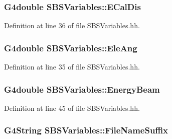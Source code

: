 \hypertarget{class_s_b_s_variables_ad7c0c85364e09e7dc5f7d687bf7fbbf4}{
\subsubsection[{E\-Cal\-Dis}]{\setlength{\rightskip}{0pt plus 5cm}G4double S\-B\-S\-Variables\-::\-E\-Cal\-Dis}}\label{class_s_b_s_variables_ad7c0c85364e09e7dc5f7d687bf7fbbf4}


Definition at line 36 of file S\-B\-S\-Variables.\-hh.

\hypertarget{class_s_b_s_variables_a3286bfb8c9f691a7315a5c97c7ea1adc}{
\subsubsection[{Ele\-Ang}]{\setlength{\rightskip}{0pt plus 5cm}G4double S\-B\-S\-Variables\-::\-Ele\-Ang}}\label{class_s_b_s_variables_a3286bfb8c9f691a7315a5c97c7ea1adc}


Definition at line 35 of file S\-B\-S\-Variables.\-hh.

\hypertarget{class_s_b_s_variables_a690e4d01c59328ad6ac6f53a9b6cc3e7}{
\subsubsection[{Energy\-Beam}]{\setlength{\rightskip}{0pt plus 5cm}G4double S\-B\-S\-Variables\-::\-Energy\-Beam}}\label{class_s_b_s_variables_a690e4d01c59328ad6ac6f53a9b6cc3e7}


Definition at line 45 of file S\-B\-S\-Variables.\-hh.

\hypertarget{class_s_b_s_variables_a47b76d8c38f66e49d9b321ef066b28e9}{
\subsubsection[{File\-Name\-Suffix}]{\setlength{\rightskip}{0pt plus 5cm}G4\-String S\-B\-S\-Variables\-::\-File\-Name\-Suffix}}\label{class_s_b_s_variables_a47b76d8c38f66e49d9b321ef066b28e9}


